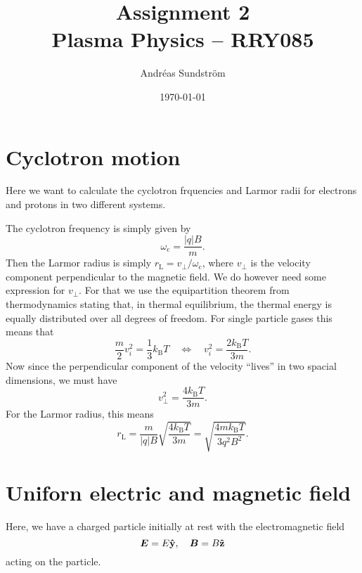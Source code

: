 \documentclass[11pt,a4paper, 
english, swedish %
]{article}
\newcommand{\wc}{\ensuremath{\omega_{\text{c}}}}
\newcommand{\rL}{\ensuremath{r_{\text{L}}}}
\begin{document}


\title{Assignment 2 \\
{\Large Plasma Physics -- RRY085}}
\author{Andréas Sundström}
\date{\today}%

\maketitle




\section{Cyclotron motion}
Here we want to calculate the cyclotron frquencies and Larmor radii
for electrons and protons in two different systems. 

The cyclotron frequency is simply given by
\begin{equation} \label{eq1:wc}
\wc = \frac{|q|B}{m}.
\end{equation}
Then the Larmor radius is simply $\rL=v_\perp/\wc$, where $v_\perp$ is
the velocity component perpendicular to the magnetic field. We do
however need some expression for $v_\perp$. For that we use the
equipartition theorem from thermodynamics stating that, in thermal
equilibrium, the thermal energy is equally distributed over all
degrees of freedom. For single particle gases this means that 
\begin{equation}
\frac{m}{2} v_i^2 = \frac{1}{3} k_\text{B} T
\quad\Longleftrightarrow\quad
v_i^2 = \frac{2k_\text{B} T}{3m}.
\end{equation}
Now since the perpendicular component of the velocity ``lives'' in two
spacial dimensions, we must have
\begin{equation}
v_\perp^2 = \frac{4k_\text{B} T}{3m}.
\end{equation}
For the Larmor radius, this means
\begin{equation}
\rL = \frac{m}{|q|B}\sqrt{\frac{4k_\text{B} T}{3m}}
=\sqrt{\frac{4m k_\text{B} T}{3q^2B^2}}.
\end{equation}


\section{Uniforn electric and magnetic field}
Here, we have a charged particle initially at rest with the
electromagnetic field
\begin{equation}
\vb*E = E\vu{y}\qc
\vb*B = B\vu{z}
\end{equation}
acting on the particle.
\end{document}
